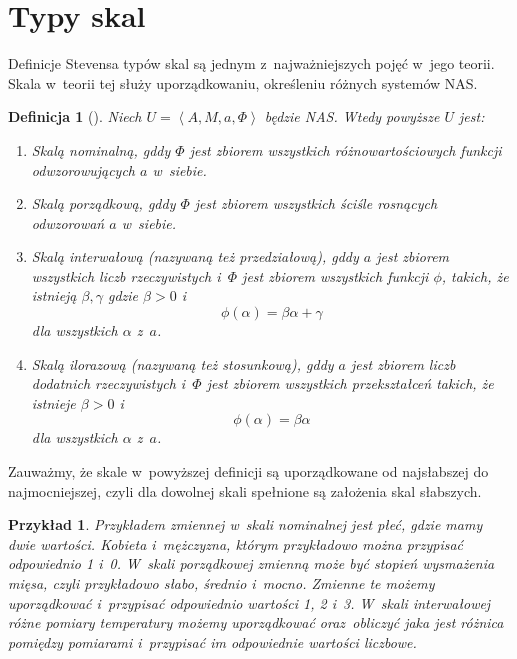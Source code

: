 \documentclass[12pt,a4paper]{report}
\newtheorem{definition}{Definicja}[chapter]
\newtheorem{przyklad}{Przykład}
\newcommand{\tuple}[1]{\left\langle {#1} \right\rangle}
\begin{document}
\section{Typy skal}
Definicje Stevensa typów skal są jednym z~najważniejszych pojęć w~jego teorii. Skala w~teorii tej służy uporządkowaniu, określeniu różnych systemów NAS.
\begin{definition}[{\citep[Def. 3]{adams1965theory}}]
Niech $U=\tuple{A, M, a, \Phi}$ będzie NAS. Wtedy powyższe $U$ jest:
\begin{enumerate}
\item
Skalą nominalną, gddy $\Phi$ jest zbiorem wszystkich różnowartościowych funkcji odwzorowujących $a$ w~siebie.
\item
Skalą porządkową, gddy $\Phi$ jest zbiorem wszystkich ściśle rosnących odwzorowań $a$ w~siebie.
\item
Skalą interwałową (nazywaną też przedziałową), gddy $a$ jest zbiorem wszystkich liczb rzeczywistych i~$\Phi$ jest zbiorem wszystkich funkcji $\phi$, takich, że istnieją $\beta,\gamma$ gdzie $\beta>0$ i
\begin{equation*}
\phi(\alpha)=\beta\alpha+\gamma
\end{equation*}
dla wszystkich $\alpha$ z~$a$.
\item
Skalą ilorazową (nazywaną też stosunkową), gddy $a$ jest zbiorem liczb dodatnich rzeczywistych i~$\Phi$ jest zbiorem wszystkich przekształceń takich, że istnieje $\beta>0$ i
\begin{equation*}
\phi(\alpha)=\beta\alpha
\end{equation*}
dla wszystkich $\alpha$ z~$a$.
\end{enumerate}
\end{definition}

Zauważmy, że skale w~powyższej definicji są uporządkowane od najsłabszej do najmocniejszej, czyli dla dowolnej skali spełnione są założenia skal słabszych.
\begin{przyklad}
Przykładem zmiennej w~skali nominalnej jest płeć, gdzie mamy dwie wartości. Kobieta i~mężczyzna, którym przykładowo można przypisać odpowiednio 1 i~0. W~skali porządkowej zmienną może być stopień wysmażenia mięsa, czyli przykładowo słabo, średnio i~mocno. Zmienne te możemy uporządkować i~przypisać odpowiednio wartości 1, 2 i~3. W~skali interwałowej różne pomiary temperatury możemy uporządkować oraz~obliczyć jaka jest różnica pomiędzy pomiarami i~przypisać im odpowiednie wartości liczbowe.
\end{przyklad}
\end{document}
